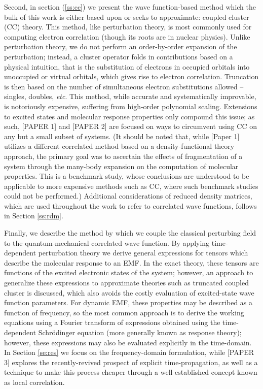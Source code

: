 Second, in section (\ref{ss:cc}) we present the wave
function-based method which the bulk of this work is either
based upon or seeks to approximate: coupled cluster (CC) theory.
\cite{Sinanoglu1964,Cizek1966,Cizek1969,Crawford2000} This method,
like perturbation theory, is most commonly used for computing electron
correlation (though its roots are in nuclear physics).  Unlike perturbation
theory, we do not perform an order-by-order expansion of the perturbation;
instead, a cluster operator folds in contributions based on a physical
intuition, 
that is the substitution of electrons in occupied orbitals into
unoccupied or virtual orbitals,
which gives rise to electron correlation. 
Truncation is then based on the
number of simultaneous electron substitutions allowed -- singles, doubles, \textit{etc}.
This
method, while accurate and systematically improvable, is notoriously
expensive, suffering from high-order polynomial scaling. Extensions to
excited states and molecular response properties only compound this issue;
\cite{Hoodbhoy1979,Crawford2006,Helgaker2012,Crawford2019} as such, [PAPER 1]
and [PAPER 2] are focused on ways to circumvent using CC on any but a small
subset of systems. (It should be noted that, while [Paper 1] utilizes a
different correlated method based on a density-functional theory approach,
the primary goal was to ascertain the effects of fragmentation of a system
through the many-body expansion on the computation of molecular properties.
This is a benchmark study, whose conclusions are understood to be applicable
to more expensive methods such as CC, where such benchmark studies could
not be performed.)  Additional considerations of reduced density matrices,
\cite{RDM1976,Harris1992,pinkbook} which are used throughout the work to
refer to correlated wave functions, follows in Section \ref{ss:rdm}.

Finally, we describe the method by which we couple the classical perturbing field to the 
quantum-mechanical correlated wave function. 
By applying time-dependent perturbation theory\cite{Langhoff} 
we derive general expressions for tensors which describe 
the molecular response to an EMF. In the exact theory, these tensors are functions of the 
excited electronic states of the system; however, an approach to generalize 
these expressions to approximate theories such as truncated coupled cluster is discussed,
\cite{Koch1990,Pedersen1997,Christiansen1998,Norman2011}
which also avoids the costly evaluation of excited-state wave function parameters. 
For dynamic EMF, these properties may be 
described as a function of frequency, so the most common approach is to derive the working equations
using a Fourier transform of expressions obtained using the time-dependent Schr\"odinger equation 
(more generally known as response theory); however, these expressions may also be evaluated explicitly
in the time-domain.
\cite{Goings2018,Li2020}
In Section \ref{se:res} we focus on the frequency-domain formulation, while
[PAPER 3] explores the recently-revived prospect of explicit time-propagation, as well as a 
technique to make this process cheaper through a well-established concept known as 
local correlation.\cite{Werner2006} 
